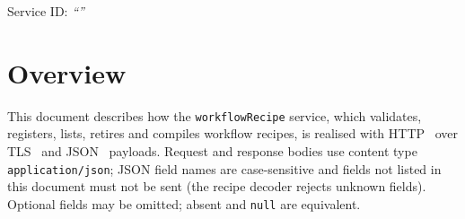 \documentclass[a4paper]{arrowhead}
\begin{document}
\ArrowheadSetup

\begin{center}
  \vspace*{1cm}
  \huge{\arrowtitle}

  \vspace*{0.2cm}
  \LARGE{\arrowtype}
  \vspace*{1cm}

  \Large{Service ID: \textit{``\arrowid''}}
  \vspace*{\fill}

  

  \vspace*{1cm}
  \vspace*{\fill}

  \begin{abstract}
    This document describes the HTTP/TLS/JSON interface of the \texttt{workflow\allowbreak{}Recipe} service of the Eclipse Arrowhead workflow support systems, service version 1.0.0, documentation edition 5.4.0. It realises the abstract operations of the \texttt{workflow\allowbreak{}Recipe} SD.
  \end{abstract}

  \vspace*{1cm}
\end{center}

\newpage

\tableofcontents
\newpage

\section{Overview}
\label{sec:overview}
This document describes how the \texttt{workflow\allowbreak{}Recipe} service, which validates, registers, lists, retires and compiles workflow recipes, is realised with HTTP~\cite{rfc9110}
over TLS~\cite{rfc8446} and JSON~\cite{rfc8259} payloads. Request and response bodies use content type
\texttt{application/\allowbreak{}json}; JSON field names are case-sensitive and fields not listed in this document must not be sent
(the recipe decoder rejects unknown fields). Optional fields may be omitted; absent and \texttt{null} are equivalent.
\end{document}
